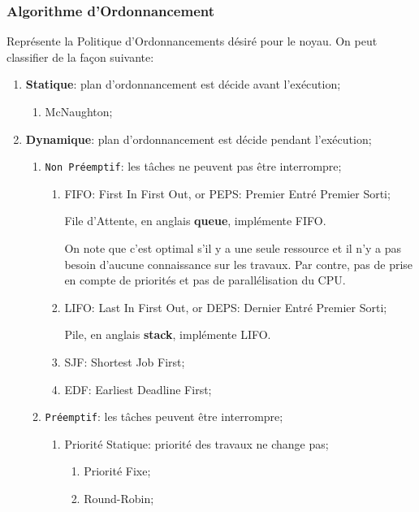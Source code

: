 \documentclass{article}
\begin{document}
\subsubsection{Algorithme d'Ordonnancement}\label{def:algorithmeOrdonnancement}
Représente la Politique d'Ordonnancements désiré pour le noyau. On peut classifier de la façon suivante:
\begin{enumerate}[rightmargin=\leftmargin]
    \item \textbf{Statique}: plan d'ordonnancement est décide avant l'exécution;
    \begin{enumerate}[noitemsep]
        \item McNaughton;
    \end{enumerate}
    
    \item \textbf{Dynamique}: plan d'ordonnancement est décide pendant l'exécution;
    \begin{enumerate}[noitemsep, rightmargin=\leftmargin]
        \item \texttt{Non Préemptif}: les tâches ne peuvent pas être interrompre;
        \begin{enumerate}[rightmargin=\leftmargin]
            \item FIFO: First In First Out, or PEPS: Premier Entré Premier Sorti;
            \begin{remark}\label{def:queue}
                File d'Attente, en anglais \textbf{queue}, implémente FIFO.
            \end{remark}
            On note que c'est optimal s'il y a une seule ressource et il n'y a pas besoin d'aucune connaissance sur les travaux. Par contre, pas de prise en compte de priorités et pas de parallélisation du CPU.

            \item LIFO: Last In First Out, or DEPS: Dernier Entré Premier Sorti;
            \begin{remark}\label{def:stack}
                Pile, en anglais \textbf{stack}, implémente LIFO.
            \end{remark}

            \item SJF: Shortest Job First;

            \item EDF: Earliest Deadline First;

        \end{enumerate}
        
        \item \texttt{Préemptif}: les tâches peuvent être interrompre;
        \begin{enumerate}
            \item Priorité Statique: priorité des travaux ne change pas;
            \begin{enumerate}[noitemsep]
                \item Priorité Fixe;
                \item Round-Robin;
            \end{enumerate}
            

\end{enumerate}
\end{enumerate}
\end{enumerate}
\end{document}
